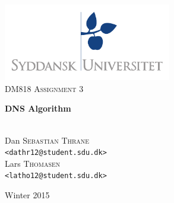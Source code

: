 \documentclass[a4paper,11pt,oneside]{book}
\title{}
\author{}
\date{}
\begin{document}
\begin{titlepage}
\begin{center}

\thispagestyle{empty}
\includegraphics[width=0.55\textwidth]{logo.pdf}\\[1cm]    
\textsc{\Large DM818 Assignment 3}\\[0.5cm]

\begin{Huge}
\textbf{DNS Algorithm}
\end{Huge}

\vspace{4cm}

\begin{minipage}{1\textwidth}
\begin{center}
\emph{}\\

Dan \textsc{Sebastian Thrane}\\
\verb!<dathr12@student.sdu.dk>!\\

Lars \textsc{Thomasen}\\
\verb!<latho12@student.sdu.dk>!\\

\end{center}
\end{minipage}
\begin{minipage}{0.4\textwidth}
\end{minipage}

\vfill
{\large Winter 2015}\\

\end{center}
\end{titlepage}

\renewcommand{\contentsname}{Table of Contents}
\tableofcontents
\thispagestyle{empty}
\end{document}

